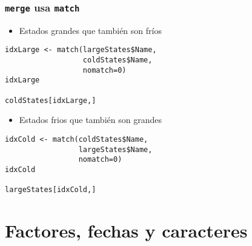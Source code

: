 \documentclass[xcolor={usenames,svgnames,dvipsnames}]{beamer}
\begin{document}
\begin{frame}[fragile]
\frametitle{\texttt{merge} usa \texttt{match}}
\label{sec-4-2-8}

\begin{itemize}
\item Estados grandes que también son fríos
\end{itemize}

\lstset{language=R}
\begin{lstlisting}
idxLarge <- match(largeStates$Name,
                  coldStates$Name,
                  nomatch=0)
idxLarge

coldStates[idxLarge,]
\end{lstlisting}

\begin{itemize}
\item Estados frios que también son grandes
\end{itemize}

\lstset{language=R}
\begin{lstlisting}
idxCold <- match(coldStates$Name,
                 largeStates$Name,
                 nomatch=0)
idxCold

largeStates[idxCold,]
\end{lstlisting}
\end{frame}
\section{Factores, fechas y caracteres}
\label{sec-5}
\end{document}
